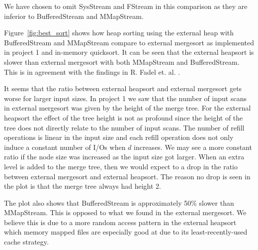 We have chosen to omit SysStream and FStream in this comparison as they are inferior to BufferedStream and MMapStream.

Figure~\ref{fig:best_sort} shows how heap sorting using the external heap with BufferedStream and MMapStream compare to external mergesort as implemented in project 1 and in-memory quicksort. It can be seen that the external heapsort is slower than external mergesort with both MMapStream and BufferedStream. This is in agreement with the findings in R. Fadel et. al. \citep{Fadel1999345}.

It seems that the ratio between external heapsort and external mergesort gets worse for larger input sizes. In project 1 we saw that the number of input scans in external mergesort was given by the height of the merge tree. For the external heapsort the effect of the tree height is not as profound since the height of the tree does not directly relate to the number of input scans. The number of refill operations is linear in the input size and each refill operation does not only induce a constant number of I/Os when $d$ increases. We may see a more constant ratio if the node size was increased as the input size got larger. When an extra level is added to the merge tree, then we would expect to a drop in the ratio between external mergesort and external heapsort. The reason no drop is seen in the plot is that the merge tree always had height 2.

The plot also shows that BufferedStream is approximately 50\% slower than MMapStream. This is opposed to what we found in the external mergesort. We believe this is due to a more random access pattern in the external heapsort which memory mapped files are especially good at due to its least-recently-used cache strategy.